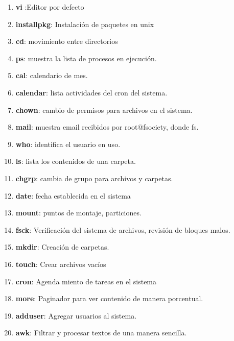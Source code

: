 \documentclass[paper=a4, fontsize=12pt]{article}        %
\numberwithin{equation}{section}                        %
\numberwithin{table}{section}                           %
\begin{document}
\begin{enumerate}
  \item \textbf{vi} :Editor por defecto
\item \textbf{installpkg}: Instalación de paquetes en unix
\item \textbf{cd}: movimiento entre directorios
\item \textbf{ps}: muestra la lista de procesos en ejecución.
\item \textbf{cal}: calendario de mes.
\item \textbf{calendar}: lista actividades del cron del sistema.
\item \textbf{chown}: cambio de permisos para archivos en el sistema.
\item \textbf{mail}: muestra email recibidos por root@fsociety, donde fs.
\item \textbf{who}: identifica el usuario en uso.
\item \textbf{ls}: lista los contenidos de una carpeta.
\item \textbf{chgrp}: cambia de grupo para archivos y carpetas.
\item \textbf{date}: fecha establecida en el sistema
\item \textbf{mount}: puntos de montaje, particiones.
\item \textbf{fsck}: Verificación del sistema de archivos, revisión de bloques malos.
\item \textbf{mkdir}: Creación de carpetas.
\item \textbf{touch}: Crear archivos vacíos 
\item \textbf{cron}: Agenda miento de tareas en el sistema
\item \textbf{more}: Paginador para ver contenido de manera porcentual.
\item \textbf{adduser}: Agregar usuarios al sistema.
\item \textbf{awk}: Filtrar y procesar textos de una manera sencilla.
\begin{figure}[H]
    \centering
\end{figure}
\end{enumerate}
\end{document}
